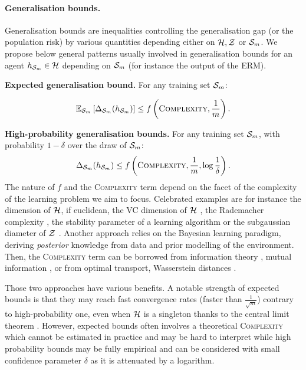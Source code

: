 \paragraph{Generalisation bounds.} Generalisation bounds are inequalities controlling the generalisation gap (or the population risk) by various quantities depending either on $\H,\Z$ or $\S_m$. We propose below general patterns usually involved in generalisation bounds for an agent $h_{\Sm}\in\H$ depending on $\S_m$ (for instance the output of the ERM). 

\textbf{Expected generalisation bound.} For any training set $\S_m$:

\begin{align} 
  \label{eq: expected-bound}
  \mathbb{E}_{\S_m}\LB \Delta_{\Sm}(h_{\Sm}) \RB \leq f\LP \textsc{Complexity}, \frac{1}{m}\RP. 
\end{align}

\textbf{High-probability generalisation bounds.} For any training set $\S_m$, with probability $1-\delta$ over the draw of $\Sm$:
\begin{align}
  \label{eq: hp-bound}
  \Delta_{\Sm}(h_{\Sm}) \leq f\LP \textsc{Complexity}, \frac{1}{m}, \log\frac{1}{\delta}\RP.
\end{align}
The nature of $f$ and the \textsc{Complexity} term depend on the facet of the complexity of the learning problem we aim to focus. Celebrated examples are for instance the dimension of $\H$, if euclidean, the VC dimension of $\H$ \citep{vapnik2000learning}, the Rademacher complexity \citep{bartlett2001rademacher,bartlett2002rademacher},  the stability parameter of a learning algorithm \citep{bousquet2000algo} or the subgaussian diameter of $\Z$ \citep{kontorovich2014conc}. 
Another approach relies on the Bayesian learning paradigm, deriving \emph{posterior} knowledge from data and prior modelling of the environment. 
Then, the \textsc{Complexity} term can be borrowed from information theory \citep{cover2001elements}, \eg mutual information \citep{neal2012bayesian}, or from optimal transport, \eg Wasserstein distances \citep{wang2019information,rodriguez2021tighter}. 

Those two approaches have various benefits. A notable strength of expected bounds is that they may reach fast convergence rates (\ie faster than $\frac{1}{\sqrt{m}}$) contrary to high-probability one, even when $\H$ is a singleton thanks to the central limit theorem \citep{grunwald2021mac}. However, expected bounds often involves a theoretical \textsc{Complexity} which cannot be estimated in practice and may be hard to interpret while high probability bounds may be fully empirical and can be considered with small confidence parameter $\delta$ as it is attenuated by a logarithm.

